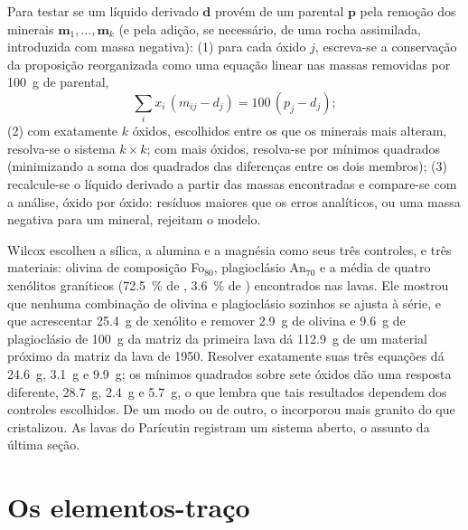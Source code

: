\begin{method}\label{met:b2:magmatic-differentiation:massbalance}
Para testar se um líquido derivado $\mathbf d$ provém de um  parental $\mathbf p$ pela
remoção dos minerais $\mathbf m_1, \dots, \mathbf m_k$ (e pela adição, se necessário, de uma
rocha assimilada, introduzida com massa negativa): (1) para cada óxido $j$, escreva-se a
conservação da proposição reorganizada como uma equação linear nas massas
removidas por \qty{100}{g} de  parental,
\[
\sum_i x_i\,(m_{ij} - d_j) = 100\,(p_j - d_j);
\]
(2) com exatamente $k$ óxidos, escolhidos entre os que os minerais mais alteram, resolva-se o
sistema $k \times k$; com mais óxidos, resolva-se por mínimos quadrados (minimizando a soma
dos quadrados das diferenças entre os dois membros); (3) recalcule-se o líquido derivado a partir
das massas encontradas e compare-se com a análise, óxido por óxido: resíduos maiores
que os erros analíticos, ou uma massa negativa para um mineral, rejeitam o modelo.
\end{method}

Wilcox escolheu a sílica, a alumina e a magnésia como seus três controles, e três
materiais: olivina de composição Fo$_{80}$, plagioclásio An$_{70}$ e a média
de quatro xenólitos graníticos (\qty{72.5}{\percent} de , \qty{3.6}{\percent} de
) encontrados nas lavas. Ele mostrou que nenhuma combinação de olivina e
plagioclásio sozinhos se ajusta à série, e que acrescentar \qty{25.4}{g} de xenólito e
remover \qty{2.9}{g} de olivina e \qty{9.6}{g} de plagioclásio de
\qty{100}{g} da matriz da primeira lava dá \qty{112.9}{g} de um material
próximo da matriz da lava de 1950. Resolver exatamente suas três equações
dá \qty{24.6}{g}, \qty{3.1}{g} e \qty{9.9}{g}; os mínimos quadrados sobre sete óxidos
dão uma resposta diferente, \qty{28.7}{g}, \qty{2.4}{g} e \qty{5.7}{g}, o que lembra
que tais resultados dependem dos controles escolhidos. De um modo ou de outro, o  incorporou mais
granito do que cristalizou. As lavas do Parícutin registram um sistema aberto, o
assunto da última seção.

\section{Os elementos-traço}\label{sec:b2:magmatic-differentiation:trace}

